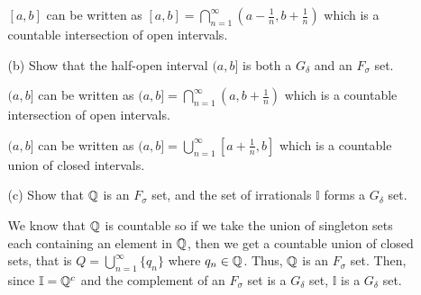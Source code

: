 \documentclass[12pt,letterpaper]{article}
\begin{document}
\begin{itemize}[leftmargin=!,labelindent=5pt]
\begin{itemize}
                    $[a, b]$ can be written as $[a, b] = \bigcap_{n=1}^{\infty}(a-\frac{1}{n}, b+\frac{1}{n})$ which is a countable intersection of open intervals.
                \item [(b)] Show that the half-open interval $(a, b]$ is both a $G_\delta$ and an $F_\sigma$ set.
                    
                    $(a, b]$ can be written as $(a, b] = \bigcap_{n=1}^{\infty}(a, b+\frac{1}{n})$ which is a countable intersection of open intervals.

                    $(a, b]$ can be written as $(a, b] = \bigcup_{n=1}^{\infty}[a + \frac{1}{n}, b]$ which is a countable union of closed intervals.
                \item [(c)] Show that $\mathbb{Q}$ is an $F_\sigma$ set, and the set of irrationals $\mathbb{I}$ forms a $G_\delta$ set.
                
                    We know that $\mathbb{Q}$ is countable so if we take the union of singleton sets each containing an element in $\mathbb{Q}$, then we get a countable union of closed sets, that is $Q = \bigcup_{n=1}^\infty \{q_n\}$ where $q_n \in \mathbb{Q}$.
                    Thus, $\mathbb{Q}$ is an $F_\sigma$ set.
                    Then, since $\mathbb{I} = \mathbb{Q}^c$ and the complement of an $F_\sigma$ set is a $G_\delta$ set, $\mathbb{I}$ is a $G_\delta$ set.
            \end{itemize}
    \end{itemize}
\end{document}
